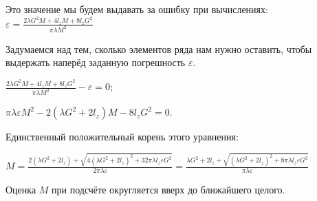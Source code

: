 Это значение мы будем выдавать за ошибку при вычислениях:\\
$\varepsilon = \frac{2 \lambda G^2 M + 4 l_z M + 8 l_z G^2}{\pi \lambda M^2}$

Задумаемся над тем, сколько элементов ряда нам нужно оставить, чтобы выдержать наперёд заданную погрешность $\varepsilon$.

$\frac{2 \lambda G^2 M + 4 l_z M + 8 l_z G^2}{\pi \lambda M^2} - \varepsilon = 0$;

$\pi \lambda \varepsilon M^2 - 2 \left( \lambda G^2 + 2 l_z \right) M - 8 l_z G^2 = 0$.

Единственный положительный корень этого уравнения:

$M = \frac{2 \left( \lambda G^2 + 2 l_z \right) + \sqrt{4 \left( \lambda G^2 + 2 l_z \right)^2 + 32 \pi \lambda l_z \varepsilon G^2}}{2 \pi \lambda \varepsilon} =
\frac{\lambda G^2 + 2 l_z + \sqrt{\left( \lambda G^2 + 2 l_z \right)^2 + 8 \pi \lambda l_z \varepsilon G^2}}{\pi \lambda \varepsilon}$

Оценка $M$ при подсчёте округляется вверх до ближайшего целого.